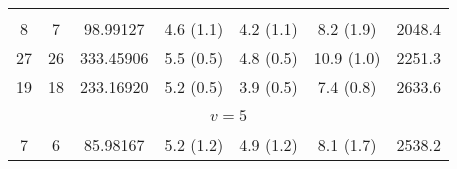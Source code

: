 \begin{table*}[htp]
\begin{tabular}{ccccccc}
\vspace{-0.75em}\\
 8 & 7 & 98.99127 & 4.6 (1.1) & 4.2 (1.1) & 8.2 (1.9) & 2048.4 \\
 27 & 26 & 333.45906 & 5.5 (0.5) & 4.8 (0.5) & 10.9 (1.0) & 2251.3 \\
 19 & 18 & 233.16920 & 5.2 (0.5) & 3.9 (0.5) & 7.4 (0.8) & 2633.6 \\
\hline
&\vspace{-0.75em}\\
\multicolumn{7}{c}{$v = 5$} \\
\vspace{-0.75em}\\
 7 & 6 & 85.98167 & 5.2 (1.2) & 4.9 (1.2) & 8.1 (1.7) & 2538.2 \\
\end{tabular}

\par 
\end{table*}
